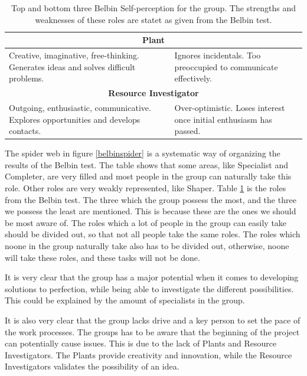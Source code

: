 \begin{table}[ht]
\begin{tabular}{|p{}|p{}|}
\multicolumn{2}{|c|}{\textbf{Plant}}                                                                                                                                             \\ \hline
Creative, imaginative, free-thinking. Generates ideas and solves difficult problems.              & Ignores incidentals. Too preoccupied to communicate effectively.             \\ \hline
\multicolumn{2}{|c|}{\textbf{Resource Investigator}}                                                                                                                             \\ \hline
Outgoing, enthusiastic, communicative. Explores opportunities and develops contacts.              & Over-optimistic. Loses interest once initial enthusiasm has passed.          \\ \hline
\end{tabular}
\caption{Top and bottom three Belbin Self-perception for the group. The strengths and weaknesses of these roles are statet as given from the Belbin test.}
\label{belbintable}
\end{table}


The spider web in figure \ref{belbinspider} is a systematic way of organizing the results of the Belbin test. The table shows that some areas, like Specialist and Completer, are very filled and most people in the group can naturally take this role. Other roles are very weakly represented, like Shaper. 
Table \ref{belbintable} is the roles from the Belbin test. The three which the group possess the most, and the three we possess the least are mentioned. This is because these are the ones we should be most aware of. 
The roles which a lot of people in the group can easily take should be divided out, so that not all people take the same roles. The roles which noone in the group naturally take also has to be divided out, otherwise, noone will take these roles, and these tasks will not be done. 


It is very clear that the group has a major potential when it comes to developing solutions to perfection, while being able to investigate the different possibilities. 
This could be explained by the amount of specialists in the group.

It is also very clear that the group lacks drive and a key person to set the pace of the work processes. 
The groups has to be aware that the beginning of the project can potentially cause issues. 
This is due to the lack of Plants and Resource Investigators. 
The Plants provide creativity and innovation, while the Resource Investigators validates the possibility of an idea.

